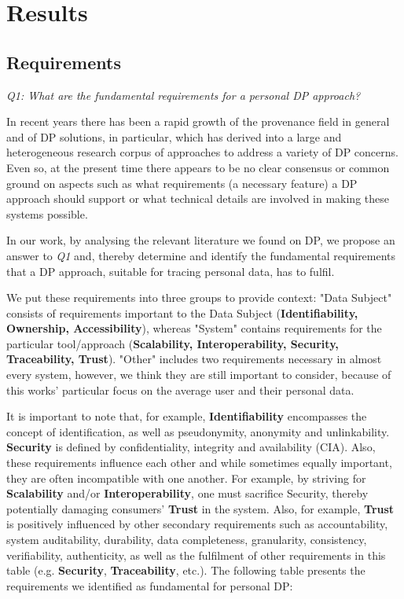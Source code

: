 \chapter{Results}
\label{ch:results}

\section{Requirements}
\label{sec:requirements}

\textit{Q1: What are the fundamental requirements for a personal DP approach?} \newline

In recent years there has been a rapid growth of the provenance field in general and of DP solutions, in particular, which has derived into a large and heterogeneous research corpus of approaches to address a variety of DP concerns. Even so, at the present time there appears to be no clear consensus or common ground on aspects such as what requirements (a necessary feature) a DP approach should support or what technical details are involved in making these systems possible.

In our work, by analysing the relevant literature we found on DP, we propose an answer to \textit{Q1} and, thereby determine and identify the fundamental requirements that a DP approach, suitable for tracing personal data, has to fulfil.

We put these requirements into three groups to provide context: "Data Subject" consists of requirements important to the Data Subject  (\textbf{Identifiability, Ownership, Accessibility}), whereas "System" contains requirements for the particular tool/approach (\textbf{Scalability, Interoperability, Security, Traceability, Trust}). "Other" includes two requirements necessary in almost every system, however, we think they are still important to consider, because of this works' particular focus on the average user and their personal data.

It is important to note that, for example, \textbf{Identifiability} encompasses the concept of identification, as well as pseudonymity, anonymity and unlinkability. \textbf{Security} is defined by confidentiality, integrity and availability (CIA). Also, these requirements influence each other and while sometimes equally important, they are often incompatible with one another. For example, by striving for \textbf{Scalability} and/or \textbf{Interoperability}, one must sacrifice Security, thereby potentially damaging consumers' \textbf{Trust} in the system. Also, for example, \textbf{Trust} is positively influenced by other secondary requirements such as accountability, system auditability, durability, data completeness, granularity, consistency, verifiability, authenticity, as well as the fulfilment of other requirements in this table (e.g. \textbf{Security}, \textbf{Traceability}, etc.). The following table presents the requirements we identified as fundamental for personal DP:\newline

